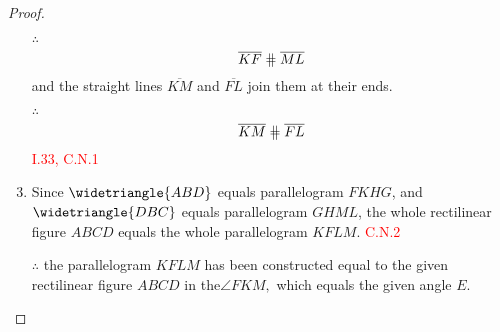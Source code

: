 \begin{proof}
\begin{enumerate}
    \item[$\therefore$] 
    \[\overline{KF} \eqparallel \overline{ML}\]
    and the straight lines $\overline{KM}$ and $\overline{FL}$ join them at their ends. 
    
    \clearpage
    
    \item[$\therefore$] \[\overline{KM} \eqparallel \overline{FL}\]\hfill\textcolor{red}{ I.33, C.N.1}
    
   \item Since $\widetriangle{ABD}$ equals parallelogram $FKHG$, and $\widetriangle{DBC}$ equals parallelogram $GHML$, the whole rectilinear figure $ABCD$ equals the whole parallelogram $KFLM$.\hfill\textcolor{red}{ C.N.2}
   
    \item[$\therefore$] the parallelogram $KFLM$ has been constructed equal to the given rectilinear figure $ABCD$ in the$\angle{FKM},$ which equals the given angle $E$.
    
\end{enumerate}

\end{proof}

\clearpage

